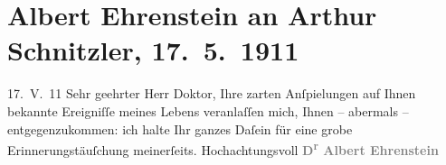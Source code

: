

         \renewcommand{\erwaehnteOrte}{Orte: Wien}
         \renewcommand{\erwaehnteWerke}{}
               \section[Albert Ehrenstein an Arthur Schnitzler, 17. 5. 1911]{ Albert Ehrenstein an Arthur Schnitzler, 17. 5. 1911}\nopagebreak{}\rehead{ }\begin{ledgroupsized}[t]{13cm}\normalsize\beginnumbering \toendnotes[C]{\smallbreak\pagebreak[2]} 
\pstart
           \raggedleft{}{\pb}17. V. 11\pend
           \pstart{}Sehr geehrter Herr Doktor,\pend\pstart
           Ihre zarten Anſpielungen auf Ihnen bekannte Ereigniſſe meines Lebens veranlaſſen
               mich, Ihnen – abermals – entgegenzukommen: ich halte Ihr ganzes Daſein für eine grobe
               Erinnerungstäuſchung meinerſeits.\pend
           \pstart Hochachtungsvoll\pend{}\pstart
           \centering{}{\pb}\textcolor{gray}{\textbf{D\textsuperscript{r} Albert Ehrenstein}}\pend
           
         
         \endnumbering{}\end{ledgroupsized}  \newcommand{\dateiname}{L02020}\newcommand{\titel}{Albert Ehrenstein an Arthur Schnitzler, 17. 5. 1911}\newcommand{\editorInnen}{Martin Anton Müller und Gerd-Hermann Susen}
      